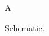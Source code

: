 \documentclass{article}
\begin{document}
\begin{figure}
A
\caption{Schematic.}
\end{figure}
\end{document}
